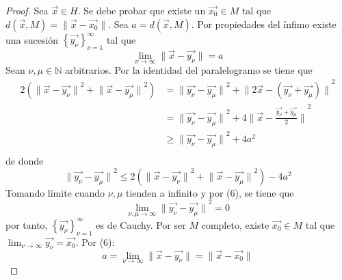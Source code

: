 \documentclass[12pt]{report}
\newcounter{it}
\theoremstyle{largebreak}
\newcommand\norm[1]{\ensuremath{\|#1\|}}
\begin{document}
    \begin{proof}
        Sea $\vec{x}\in H$. Se debe probar que existe un $\vec{x_0}\in M$ tal que $d(\vec{x},M)=\norm{\vec{x}-\vec{x_0}}$. Sea $a=d(\vec{x},M)$. Por propiedades del ínfimo existe una sucesión $\left\{\vec{y_\nu} \right\}_{\nu=1}^{\infty}$ tal que
        \begin{equation}
            \lim_{\nu\rightarrow\infty}\norm{\vec{x}-\vec{y_\nu}}=a
        \end{equation}
        Sean $\nu,\mu\in\mathbb{N}$ arbitrarios. Por la identidad del paralelogramo se tiene que
        \begin{equation*}
            \begin{split}
                2\left(\norm{\vec{x}-\vec{y_\nu}}^2+\norm{\vec{x}-\vec{y_\mu}}^2 \right)
                &=\norm{\vec{y_\nu}-\vec{y_\mu}}^2+\norm{2\vec{x}-(\vec{y_\nu}+\vec{y_\mu})}^2\\
                &=\norm{\vec{y_\nu}-\vec{y_\mu}}^2+4\norm{\vec{x}-\frac{\vec{y_\nu}+\vec{y_\mu}}{2}}^2\\
                &\geq\norm{\vec{y_\nu}-\vec{y_\mu}}^2+4a^2\\
            \end{split}
        \end{equation*}
        de donde
        \begin{equation*}
            \norm{\vec{y_\nu}-\vec{y_\mu}}^2\leq2\left(\norm{\vec{x}-\vec{y_\nu}}^2+\norm{\vec{x}-\vec{y_\mu}}^2 \right)-4a^2
        \end{equation*}
        Tomando límite cuando $\nu,\mu$ tienden a infinito y por (6), se tiene que
        \begin{equation*}
            \lim_{\nu,\mu\rightarrow\infty}\norm{\vec{y_\nu}-\vec{y_\mu}}^2=0
        \end{equation*}
        por tanto, $\left\{\vec{y_\nu} \right\}_{\nu=1}^{\infty}$ es de Cauchy. Por ser $M$ completo, existe $\vec{x_0}\in M$ tal que $\lim_{\nu\rightarrow\infty}\vec{y_\nu}=\vec{x_0}$. Por (6):
        \begin{equation*}
            a=\lim_{\nu\rightarrow\infty}\norm{\vec{x}-\vec{y_\nu}}=\norm{\vec{x}-\vec{x_0}}
        \end{equation*}
    \end{proof}
\end{document}
